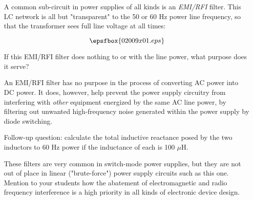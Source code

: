 

A common sub-circuit in power supplies of all kinds is an {\it EMI/RFI} filter.  This LC network is all but "transparent" to the 50 or 60 Hz power line frequency, so that the transformer sees full line voltage at all times:

$$\epsfbox{02009x01.eps}$$

If this EMI/RFI filter does nothing to or with the line power, what purpose does it serve?







An EMI/RFI filter has no purpose in the process of converting AC power into DC power.  It does, however, help prevent the power supply circuitry from interfering with {\it other} equipment energized by the same AC line power, by filtering out unwanted high-frequency noise generated within the power supply by diode switching.

\vskip 10pt

Follow-up question: calculate the total inductive reactance posed by the two inductors to 60 Hz power if the inductance of each is 100 $\mu$H.







These filters are very common in switch-mode power supplies, but they are not out of place in linear ("brute-force") power supply circuits such as this one.  Mention to your students how the abatement of electromagnetic and radio frequency interference is a high priority in all kinds of electronic device design.




